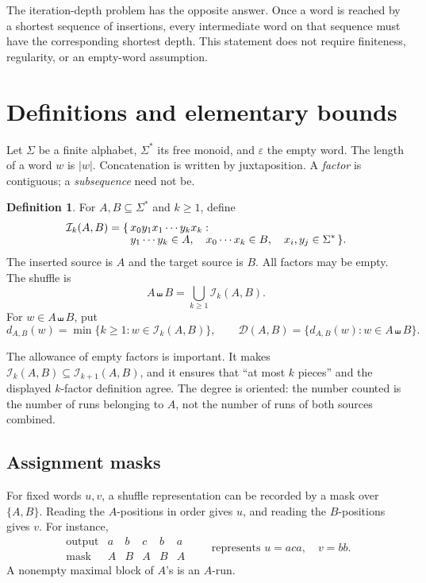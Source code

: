 \documentclass[11pt,letterpaper]{article}
\theoremstyle{definition}\newtheorem{definition}[theorem]{Definition}
\theoremstyle{remark}\newtheorem{remark}[theorem]{Remark}
\theoremstyle{definition}\newtheorem{question}[theorem]{Question}
\newcommand{\eps}{\varepsilon}
\newcommand{\sh}{\mathbin{\shuffle}}
\newcommand{\ins}[3]{\mathcal I_{#1}(#2,#3)}
\newcommand{\spec}[2]{\mathcal D(#1,#2)}
\begin{document}
The iteration-depth problem has the opposite answer. Once a word is reached by a shortest sequence of insertions, every intermediate word on that sequence must have the corresponding shortest depth. This statement does not require finiteness, regularity, or an empty-word assumption.

\section{Definitions and elementary bounds}\label{sec:definitions}

Let $\Sigma$ be a finite alphabet, $\Sigma^*$ its free monoid, and $\eps$ the empty word. The length of a word $w$ is $|w|$. Concatenation is written by juxtaposition. A \emph{factor} is contiguous; a \emph{subsequence} need not be.

\begin{definition}
For $A,B\subseteq\Sigma^*$ and $k\geq1$, define
\begin{align}
 \ins{k}{A}{B}=\{\,&x_0y_1x_1\cdots y_kx_k:\notag\\[-0.4em]
 &y_1\cdots y_k\in A,\quad x_0\cdots x_k\in B,\quad x_i,y_j\in\Sigma^*\,\}.
 \label{eq:insertion}
\end{align}
The inserted source is $A$ and the target source is $B$. All factors may be empty. The shuffle is
\[
 A\sh B=\bigcup_{k\geq1}\ins{k}{A}{B}.
\]
For $w\in A\sh B$, put
\[
 d_{A,B}(w)=\min\{k\geq1:w\in\ins{k}{A}{B}\},
 \qquad \spec{A}{B}=\{d_{A,B}(w):w\in A\sh B\}.
\]
\end{definition}

The allowance of empty factors is important. It makes $\ins{k}{A}{B}\subseteq\ins{k+1}{A}{B}$, and it ensures that ``at most $k$ pieces'' and the displayed $k$-factor definition agree. The degree is oriented: the number counted is the number of runs belonging to $A$, not the number of runs of both sources combined.

\subsection{Assignment masks}

For fixed words $u,v$, a shuffle representation can be recorded by a mask over $\{A,B\}$. Reading the $A$-positions in order gives $u$, and reading the $B$-positions gives $v$. For instance,
\[
 \begin{array}{c|ccccc}
 \text{output}&a&b&c&b&a\\
 \text{mask}&A&B&A&B&A
 \end{array}
 \qquad\text{represents }u=aca,\quad v=bb.
\]
A nonempty maximal block of $A$'s is an $A$-run.
\end{document}
